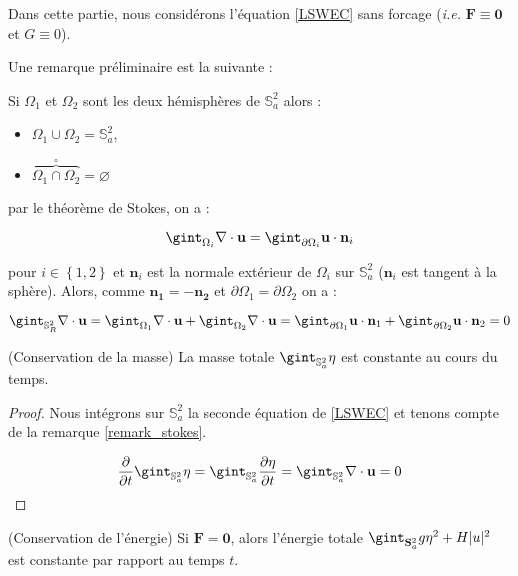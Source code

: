 Dans cette partie, nous considérons l'équation \eqref{LSWEC} sans forcage (\textit{i.e.} $\mathbf{F} \equiv \mathbf{0}$ et $G \equiv 0$).

\begin{remarque}
\label{remark_stokes}
Une remarque préliminaire est la suivante  :

Si $\Omega_1$ et $\Omega_2$ sont les deux hémisphères de $\mathbb{S}^2_a$ alors :
\begin{itemize}
\item $\Omega_1 \cup \Omega_2 = \mathbb{S}^2_a $,
\item $\overbrace{\Omega_1 \cap \Omega_2}^{\circ} = \varnothing$
\end{itemize}

par le théorème de Stokes, on a :

\begin{equation}
\gint_{\Omega_i}  \nabla \cdot \mathbf{u} = \gint_{\partial \Omega_i} \mathbf{u} \cdot \mathbf{n}_i
\end{equation}

pour $i \in \left\lbrace 1, 2 \right\rbrace$ et $\mathbf{n}_i$ est la normale extérieur de $\Omega_i$ sur $\mathbb{S}_a^2$ ($\mathbf{n}_i$ est tangent à la sphère).
Alors, comme $\mathbf{n_1} = -\mathbf{n_2}$ et $\partial \Omega_1 = \partial \Omega_2$ on a :

$$\gint_{\mathbb{S}_R^2}  \nabla \cdot \mathbf{u} = \gint_{\Omega_1}  \nabla \cdot \mathbf{u} + \gint_{\Omega_2}  \nabla \cdot \mathbf{u} = \gint_{\partial \Omega_1} \mathbf{u} \cdot \mathbf{n}_1 + \gint_{\partial \Omega_2} \mathbf{u} \cdot \mathbf{n}_2 = 0$$
\end{remarque}

\begin{proposition}
(Conservation de la masse)
La masse totale $\gint_{\mathbb{S}_a^2} \eta$ est constante au cours du temps.
\end{proposition}

\begin{proof}
Nous intégrons sur $\mathbb{S}_a^2$ la seconde équation de \eqref{LSWEC} et tenons compte de la remarque \ref{remark_stokes}.

$$\dfrac{\partial}{\partial t} \gint_{\mathbb{S}_a^2} \eta = \gint_{\mathbb{S}_a^2} \dfrac{\partial \eta}{\partial t} = \gint_{\mathbb{S}_a^2} \nabla \cdot \mathbf{u} = 0$$
\end{proof}

\begin{proposition}
(Conservation de l'énergie)
Si $\mathbf{F} = \mathbf{0}$, alors l'énergie totale $\gint_{\mathbf{S}_a^2 }g  \eta^2 + H | u |^2$ est constante par rapport au temps $t$.
\end{proposition}

